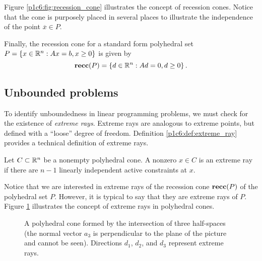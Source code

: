 Figure \ref{p1c6:fig:recession_cone} illustrates the concept of recession cones. Notice that the cone is purposely placed in several places to illustrate the independence of the point $\overline{x} \in P$.

Finally, the recession cone for a standard form polyhedral set $P = \left\{ x \in \mathbb{R}^n : Ax = b, x \geq 0 \right \}$ is given by 
%
\begin{equation*}
	{\bf recc}(P) = \left\{ d \in \mathbb{R}^n : Ad = 0, d \geq 0 \right \}.	
\end{equation*} 


\subsection{Unbounded problems}

To identify unboundedness in linear programming problems, we must check for the existence of \emph{extreme rays}. Extreme rays are analogous to extreme points, but defined with a ``loose'' degree of freedom. Definition \ref{p1c6:def:extreme_ray} provides a technical definition of extreme rays.

\begin{definition} \label{p1c6:def:extreme_ray}
	Let $C \subset \mathbb{R}^n$ be a nonempty polyhedral cone. A nonzero $x \in C$ is an extreme ray if there are $n-1$ linearly independent active constraints at $x$.
\end{definition} 

Notice that we are interested in extreme rays of the recession cone ${\bf recc} (P)$ of the polyhedral set $P$. However, it is typical to say that they are extreme rays of $P$. Figure \ref{p1c6:fig:extreme_rays} illustrates the concept of extreme rays in polyhedral cones.

\begin{figure}[h]
	\caption{A polyhedral cone formed by the intersection of three half-spaces (the normal vector $a_3$ is perpendicular to the plane of the picture and cannot be seen). Directions $d_1$, $d_2$, and $d_3$ represent extreme rays.} \label{p1c6:fig:extreme_rays}	
\end{figure}

